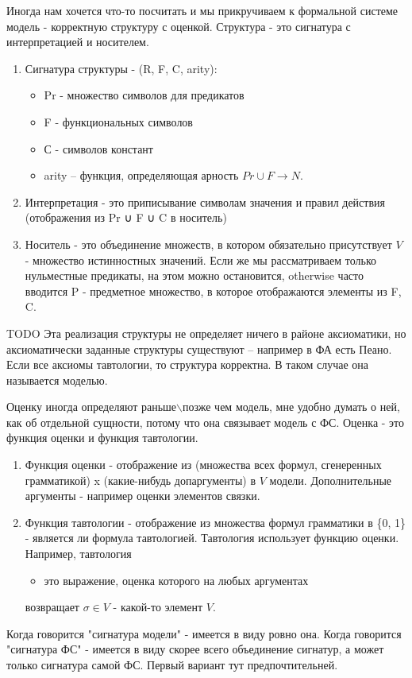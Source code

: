 Иногда нам хочется что-то посчитать и мы прикручиваем к
формальной системе модель - корректную структуру с оценкой.
Структура - это сигнатура с интерпретацией и носителем.
\begin{enumerate}
\item Сигнатура структуры - (R, F, C, arity):
\begin{itemize}
\item Pr - множество символов для предикатов
\item F - функциональных символов
\item С - символов констант
\item arity – функция, определяющая арность $Pr ∪ F \to N$.
\end{itemize}
\item Интерпретация - это приписывание символам значения
и правил действия (отображения из Pr ∪ F ∪ C в носитель)
\item Носитель - это объединение множеств, в котором обязательно
присутствует $V$ - множество истинностных значений. Если же
мы рассматриваем только нульместные предикаты, на этом
можно остановится, otherwise часто вводится P - предметное
множество, в которое отображаются элементы из F, C.
\end{enumerate}
TODO Эта реализация структуры не определяет ничего в районе
аксиоматики, но аксиоматически заданные структуры существуют
– например в ФА есть Пеано.
Если все аксиомы тавтологии, то структура корректна.
В таком случае она называется моделью.

Оценку иногда определяют раньше$\backslash$позже чем модель, мне
удобно думать о ней, как об отдельной сущности, потому что
она связывает модель с ФС.
Оценка - это функция оценки и функция тавтологии.
\begin{enumerate}
\item Функция оценки - отображение из (множества всех формул,
сгенеренных грамматикой) x (какие-нибудь допаргументы)
в $V$ модели. Дополнительные аргументы - например оценки
элементов связки.
\item Функция тавтологии - отображение из множества формул
грамматики в \{0, 1\} - является ли формула тавтологией.
Тавтология использует функцию оценки. Например, тавтология
\begin{itemize}
\item это выражение, оценка которого на любых аргументах
\end{itemize}
возвращает $σ \in V$ - какой-то элемент $V$.
\end{enumerate}

Когда говорится "сигнатура модели" - имеется в виду ровно она.
Когда говорится "сигнатура ФС" - имеется в виду скорее всего
объединение сигнатур, а может только сигнатура самой ФС. Первый
вариант тут предпочтительней.